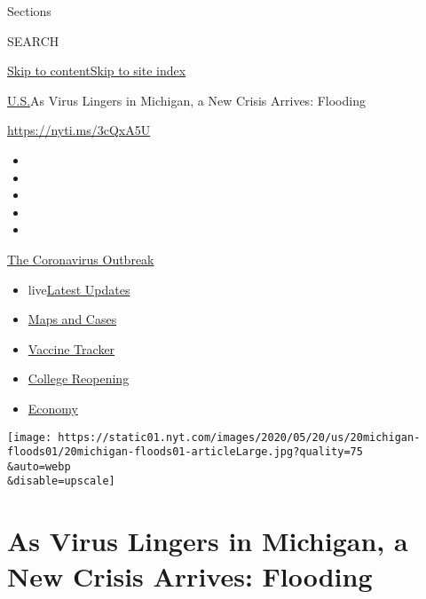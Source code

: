 Sections

SEARCH

\protect\hyperlink{site-content}{Skip to
content}\protect\hyperlink{site-index}{Skip to site index}

\href{/section/us}{U.S.}\textbar{}As Virus Lingers in Michigan, a New
Crisis Arrives: Flooding

\url{https://nyti.ms/3cQxA5U}

\begin{itemize}
\item
\item
\item
\item
\item
\end{itemize}

\href{https://www.nytimes.com/news-event/coronavirus?action=click\&pgtype=Article\&state=default\&region=TOP_BANNER\&context=storylines_menu}{The
Coronavirus Outbreak}

\begin{itemize}
\tightlist
\item
  live\href{https://www.nytimes.com/2020/08/04/world/coronavirus-cases.html?action=click\&pgtype=Article\&state=default\&region=TOP_BANNER\&context=storylines_menu}{Latest
  Updates}
\item
  \href{https://www.nytimes.com/interactive/2020/us/coronavirus-us-cases.html?action=click\&pgtype=Article\&state=default\&region=TOP_BANNER\&context=storylines_menu}{Maps
  and Cases}
\item
  \href{https://www.nytimes.com/interactive/2020/science/coronavirus-vaccine-tracker.html?action=click\&pgtype=Article\&state=default\&region=TOP_BANNER\&context=storylines_menu}{Vaccine
  Tracker}
\item
  \href{https://www.nytimes.com/2020/08/02/us/covid-college-reopening.html?action=click\&pgtype=Article\&state=default\&region=TOP_BANNER\&context=storylines_menu}{College
  Reopening}
\item
  \href{https://www.nytimes.com/live/2020/08/04/business/stock-market-today-coronavirus?action=click\&pgtype=Article\&state=default\&region=TOP_BANNER\&context=storylines_menu}{Economy}
\end{itemize}

\texttt{[image: https://static01.nyt.com/images/2020/05/20/us/20michigan-floods01/20michigan-floods01-articleLarge.jpg?quality=75\\\&auto=webp\\\&disable=upscale]}

\hypertarget{as-virus-lingers-in-michigan-a-new-crisis-arrives-flooding}{%
\section{As Virus Lingers in Michigan, a New Crisis Arrives:
Flooding}\label{as-virus-lingers-in-michigan-a-new-crisis-arrives-flooding}}

